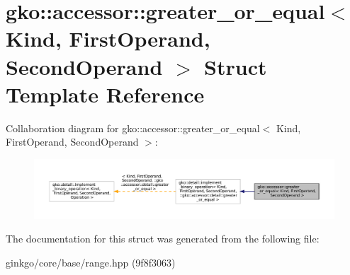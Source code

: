 \hypertarget{structgko_1_1accessor_1_1greater__or__equal}{}\section{gko\+:\+:accessor\+:\+:greater\+\_\+or\+\_\+equal$<$ Kind, First\+Operand, Second\+Operand $>$ Struct Template Reference}
\label{structgko_1_1accessor_1_1greater__or__equal}


Collaboration diagram for gko\+:\+:accessor\+:\+:greater\+\_\+or\+\_\+equal$<$ Kind, First\+Operand, Second\+Operand $>$\+:
\nopagebreak
\begin{figure}[H]
\begin{center}
\leavevmode
\includegraphics[width=350pt]{structgko_1_1accessor_1_1greater__or__equal__coll__graph}
\end{center}
\end{figure}


The documentation for this struct was generated from the following file\+:\begin{DoxyCompactItemize}
\item 
ginkgo/core/base/range.\+hpp (9f8f3063)\end{DoxyCompactItemize}

